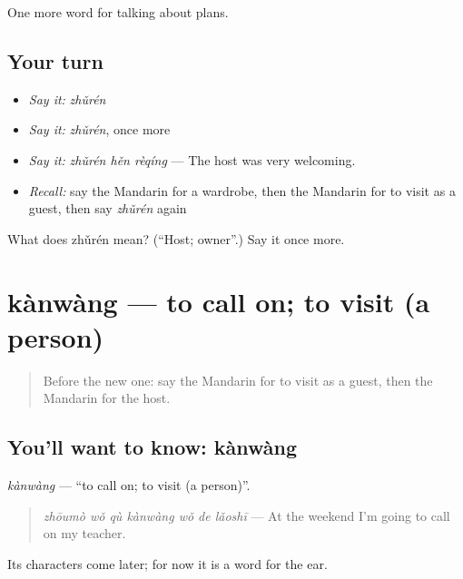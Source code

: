 \begin{grammarlens}[title={What you've built}]
One more word for talking about plans.
\end{grammarlens}

\subsection*{Your turn}
\begin{itemize}
\raggedright
  \item \emph{Say it:} \emph{zhǔrén}
  \item \emph{Say it:} \emph{zhǔrén}, once more
  \item \emph{Say it:} \emph{zhǔrén hěn rèqíng} — The host was very welcoming.
  \item \emph{Recall:} say the Mandarin for a wardrobe, then the Mandarin for to visit as a guest, then say \emph{zhǔrén} again
\end{itemize}

\begin{tcolorbox}[breakable,colback=teal!4,colframe=teal!35!black,title={Before you move on}]
What does zhǔrén mean? (\textquotedblleft{}Host; owner\textquotedblright{}.) Say it once more.
\end{tcolorbox}
\section[kànwàng]{kànwàng — to call on; to visit (a person)}

\label{lesson:ZH-C180-kanwang}



\begin{quote}
Before the new one: say the Mandarin for to visit as a guest, then the Mandarin for the host.
\end{quote}

\subsection*{You'll want to know: kànwàng}
\emph{kànwàng} — \textquotedblleft{}to call on; to visit (a person)\textquotedblright{}.

\begin{quote}
\emph{zhōumò wǒ qù kànwàng wǒ de lǎoshī} — At the weekend I'm going to call on my teacher.
\end{quote}

Its characters come later; for now it is a word for the ear.

